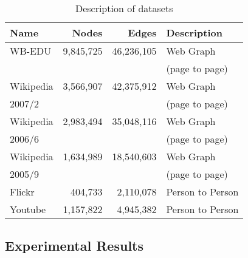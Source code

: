 \documentclass{llncs}
\begin{document}
\begin{table}[ht]
\begin{center}
\begin{tabular}{|l|r|r|l|} \hline \hline
   Name  & Nodes & Edges &  Description  \\ \hline \hline
   WB-EDU&   9,845,725  &    46,236,105   &   Web Graph                    \\
                        &            &              & (page to page) \\ \hline
   Wikipedia  & 3,566,907 & 42,375,912  & Web Graph \\
   2007/2                    &            &              & (page to page) \\\hline
   Wikipedia & 2,983,494  & 35,048,116   & Web Graph  \\ 
    2006/6                    &            &              & (page to page) \\ \hline
   Wikipedia  & 1,634,989  & 18,540,603   & Web Graph   \\ 
    2005/9                   &            &              & (page to page) \\\hline
    Flickr & 404,733  & 2,110,078    & Person to Person \\ \hline
    Youtube &   1,157,822    &  4,945,382  & Person to Person\\ \hline
\end{tabular}
\end{center}
\caption{ Description of datasets }
\label{tab:datasets}
\end{table}

\subsection{Experimental Results}
\end{document}
